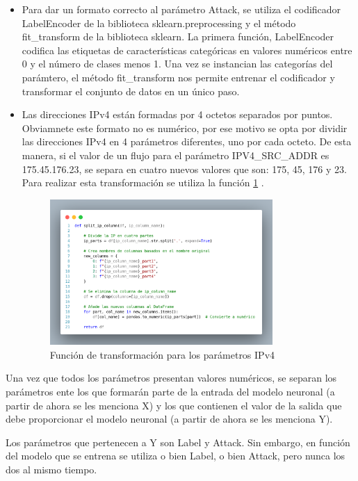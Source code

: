 \begin{itemize}
	\item Para dar un formato correcto al parámetro Attack, se utiliza el codificador LabelEncoder de la biblioteca sklearn.preprocessing y el método fit\_transform de la biblioteca sklearn. La primera función, LabelEncoder codifica las etiquetas de características categóricas en valores numéricos entre 0 y el número de clases menos 1. Una vez se instancian las categorías del parámtero, el método fit\_transform nos permite entrenar el codificador y transformar el conjunto de datos en un único paso.
	\item Las direcciones IPv4 están formadas por 4 octetos separados por puntos. Obviamnete este formato no es numérico, por ese motivo se opta por dividir las direcciones IPv4 en 4 parámetros diferentes, uno por cada octeto. De esta manera, si el valor de un flujo para el parámetro IPV4\_SRC\_ADDR es 175.45.176.23, se separa en cuatro nuevos valores que son: 175, 45, 176 y 23. Para realizar esta transformación se utiliza la función \ref{fig:funIPv4} .
\begin{figure}[htbp]
    \centering
    \includegraphics[width=0.8\textwidth]{./img/ent-datos/funIPv4.png}
    \caption{Función de transformación para los parámetros IPv4}
    \label{fig:funIPv4}
\end{figure}

\end{itemize}

Una vez que todos los parámetros presentan valores numéricos, se separan los parámetros ente los que formarán parte de la entrada del modelo neuronal (a partir de ahora se les menciona X) y los que contienen el valor de la salida que debe proporcionar el modelo neuronal (a partir de ahora se les menciona Y).

Los parámetros que pertenecen a Y son Label y Attack. Sin embargo, en función del modelo que se entrena se utiliza o bien Label, o bien Attack, pero nunca los dos al mismo tiempo.

